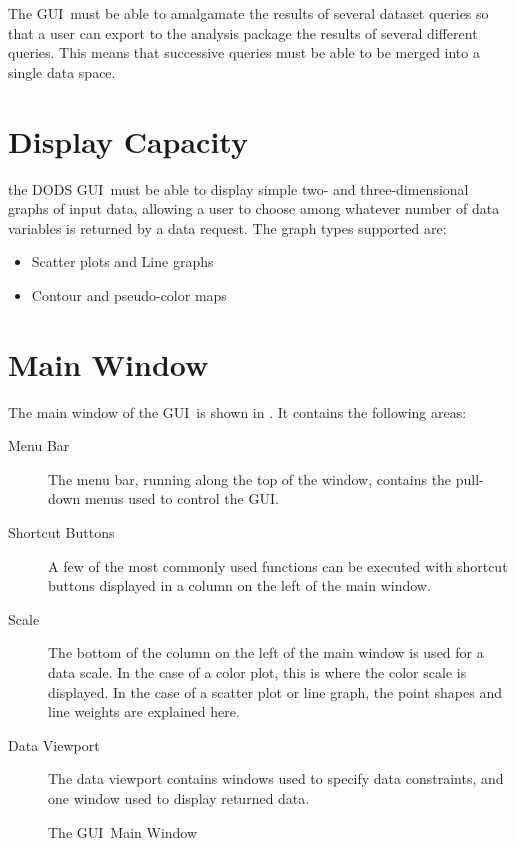 \documentclass[10pt]{report}
\newcommand{\gui}{GUI}
\begin{document}
The \gui\ must be able to amalgamate the results of several dataset
queries so that a user can export to the analysis package the results
of several different queries.  This means that successive queries must
be able to be merged into a single data space.




\section{Display Capacity}
\label{sec:display}

the DODS \gui\ must be able to display simple two- and
three-dimensional graphs of input data, allowing a user to choose
among whatever number of data variables is returned by a data
request.  The graph types supported are:

\begin{itemize}
\item Scatter plots and Line graphs
\item Contour and pseudo-color maps
\end{itemize}

\section{Main Window}
\label{sec:main-window}

The main window of the \gui\ is shown in
.  It contains the following areas:

\begin{description}
\item[Menu Bar] The menu bar, running along the top of the window,
  contains the pull-down menus used to control the \gui .
\item[Shortcut Buttons] A few of the most commonly used functions can
  be executed with shortcut buttons displayed in a column on the left
  of the main window.
\item[Scale] The bottom of the column on the left of the main window
  is used for a data scale.  In the case of a color plot, this is
  where the color scale is displayed.  In the case of a scatter plot
  or line graph, the point shapes and line weights are explained
  here. 
\item[Data Viewport] The data viewport contains windows used to
  specify data constraints, and one window used to display returned
  data.  
\end{description}

\begin{figure}[htbp] 
\centerline{}
\caption{The \gui\ Main Window}
\label{fig:gui-main-window}
\end{figure}
\end{document}
